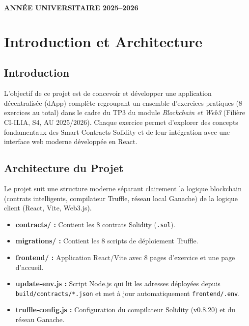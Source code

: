 \documentclass[12pt,a4paper]{report}
\begin{document}
\begin{titlepage}
    \vfill

    {\large\bfseries\color{primary} ANNÉE UNIVERSITAIRE 2025--2026}
\end{titlepage}

\tableofcontents
\newpage

\chapter{Introduction et Architecture}

\section{Introduction}
L'objectif de ce projet est de concevoir et développer une application décentralisée (dApp) complète
regroupant un ensemble d'exercices pratiques (8 exercices au total) dans le cadre du TP3 du module
\textit{Blockchain et Web3} (Filière CI-ILIA, S4, AU 2025/2026).
Chaque exercice permet d'explorer des concepts fondamentaux des Smart Contracts Solidity et de leur
intégration avec une interface web moderne développée en React.

\section{Architecture du Projet}
Le projet suit une structure moderne séparant clairement la logique blockchain
(contrats intelligents, compilateur Truffle, réseau local Ganache) de la logique client
(React, Vite, Web3.js).

\begin{itemize}
    \item \textbf{contracts/ :} Contient les 8 contrats Solidity (\texttt{.sol}).
    \item \textbf{migrations/ :} Contient les 8 scripts de déploiement Truffle.
    \item \textbf{frontend/ :} Application React/Vite avec 8 pages d'exercice et une page d'accueil.
    \item \textbf{update-env.js :} Script Node.js qui lit les adresses déployées depuis \texttt{build/contracts/*.json}
          et met à jour automatiquement \texttt{frontend/.env}.
    \item \textbf{truffle-config.js :} Configuration du compilateur Solidity (v0.8.20) et du réseau Ganache.
\end{itemize}
\end{document}
